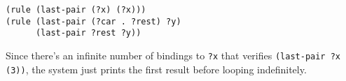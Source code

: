 \documentclass[a4paper,12pt]{article}
\begin{document}
\begin{lstlisting}
(rule (last-pair (?x) (?x)))
(rule (last-pair (?car . ?rest) ?y)
      (last-pair ?rest ?y))
\end{lstlisting}

Since there's an infinite number of bindings to \lstinline!?x! that
verifies \lstinline!(last-pair ?x (3))!, the system just prints the
first result before looping indefinitely.
\end{document}
